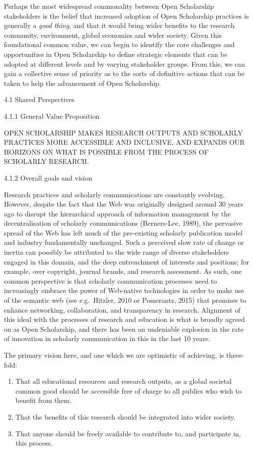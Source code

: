 \documentclass[]{article}
\providecommand{\tightlist}{%
  \setlength{\itemsep}{0pt}\setlength{\parskip}{0pt}}
\begin{document}
Perhaps the most widespread commonality between Open Scholarship
stakeholders is the belief that increased adoption of Open Scholarship
practices is generally a \emph{good thing}, and that it would bring
wider benefits to the research community, environment, global economies
and wider society. Given this foundational common value, we can begin to
identify the core challenges and opportunities in Open Scholarship to
define strategic elements that can be adopted at different levels and by
varying stakeholder groups. From this, we can gain a collective sense of
priority as to the sorts of definitive actions that can be taken to help
the advancement of Open Scholarship.

4.1 Shared Perspectives

4.1.1 General Value Proposition

OPEN SCHOLARSHIP MAKES RESEARCH OUTPUTS AND SCHOLARLY PRACTICES MORE
ACCESSIBLE AND INCLUSIVE, AND EXPANDS OUR HORIZONS ON WHAT IS POSSIBLE
FROM THE PROCESS OF SCHOLARLY RESEARCH.

4.1.2 Overall goals and vision

Research practices and scholarly communications are constantly evolving.
However, despite the fact that the Web was originally designed around 30
years ago to disrupt the hierarchical approach of information management
by the decentralisation of scholarly communications (Berners-Lee, 1989),
the pervasive spread of the Web has left much of the pre-existing
scholarly publication model and industry fundamentally unchanged. Such a
perceived slow rate of change or inertia can possibly be attributed to
the wide range of diverse stakeholders engaged in this domain, and the
deep entrenchment of interests and positions; for example, over
copyright, journal brands, and research assessment. As such, one common
perspective is that scholarly communication processes need to
increasingly embrace the power of Web-native technologies in order to
make use of the semantic web (see e.g.~Hitzler, 2010 or Pomerantz, 2015)
that promises to enhance networking, collaboration, and transparency in
research. Alignment of this ideal with the processes of research and
education is what is broadly agreed on as Open Scholarship, and there
has been an undeniable explosion in the rate of innovation in scholarly
communication in this in the last 10 years.

The primary vision here, and one which we are optimistic of achieving,
is three-fold:

\begin{enumerate}
\def\labelenumi{\arabic{enumi}.}
\tightlist
\item
  That all educational resources and research outputs, as a global
  societal common good should be accessible free of charge to all
  publics who wish to benefit from them.
\item
  That the benefits of this research should be integrated into wider
  society.
\item
  That anyone should be freely available to contribute to, and
  participate in, this process.
\end{enumerate}
\end{document}
